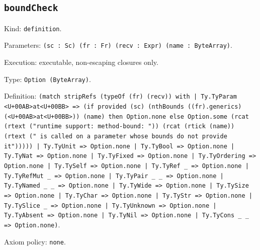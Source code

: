 \documentclass[11pt]{article}
\begin{document}
\subsection*{\texttt{boundCheck}}
\noindent Kind: \texttt{definition}.\par
\noindent Parameters: \texttt{(sc : Sc) (fr : Fr) (recv : Expr) (name : ByteArray)}.\par
\noindent Execution: executable, non-escaping closures only.\par
\noindent Type: \texttt{Option (ByteArray)}.\par
\noindent Definition: \texttt{(match stripRefs (typeOf (fr) (recv)) with | Ty.TyParam <U+00AB>at<U+00BB> => (if provided (sc) (nthBounds ((fr).generics) (<U+00AB>at<U+00BB>)) (name) then Option.none else Option.some (rcat (rtext ("runtime support: method-bound: ")) (rcat (rtick (name)) (rtext (" is called on a parameter whose bounds do not provide it"))))) | Ty.TyUnit => Option.none | Ty.TyBool => Option.none | Ty.TyNat => Option.none | Ty.TyFixed => Option.none | Ty.TyOrdering => Option.none | Ty.TySelf => Option.none | Ty.TyRef \_ => Option.none | Ty.TyRefMut \_ => Option.none | Ty.TyPair \_ \_ => Option.none | Ty.TyNamed \_ \_ => Option.none | Ty.TyWide => Option.none | Ty.TySize => Option.none | Ty.TyChar => Option.none | Ty.TyStr => Option.none | Ty.TySlice \_ => Option.none | Ty.TyUnknown => Option.none | Ty.TyAbsent => Option.none | Ty.TyNil => Option.none | Ty.TyCons \_ \_ => Option.none)}.\par
\noindent Axiom policy: \texttt{none}.\par
\end{document}
